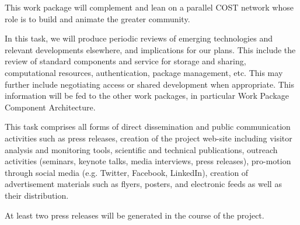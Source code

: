 \begin{workpackage}
\begin{wpdescription}
  This work package will complement and lean on a parallel COST
  network whose role is to build and animate the greater community.
\end{wpdescription}

\begin{tasklist}
\begin{task}[title=Reviewing emerging technologies]
  In this task, we will produce periodic reviews of emerging technologies and relevant
  developments elsewhere, and implications for our plans. This include the review of
  standard components and service for storage and sharing, computational resources,
  authentication, package management, etc. This may further include negotiating access or
  shared development when appropriate. This information will be fed to the other work
  packages, in particular Work Package~ Component
  Architecture.
\end{task}

\begin{task}[title=Dissemination and Communication activities]


  This task comprises all forms of direct dissemination and public communication
  activities such as press releases, creation of the project web-site including visitor
  analysis and monitoring tools, scientific and technical publications, outreach
  activities (seminars, keynote talks, media interviews, press releases), pro-motion
  through social media (e.g. Twitter, Facebook, LinkedIn), creation of advertisement
  materials such as flyers, posters, and electronic feeds as well as their distribution.


  At least two press releases will be generated in the course of the project.
  
\end{task}


\end{tasklist}
\end{workpackage}
